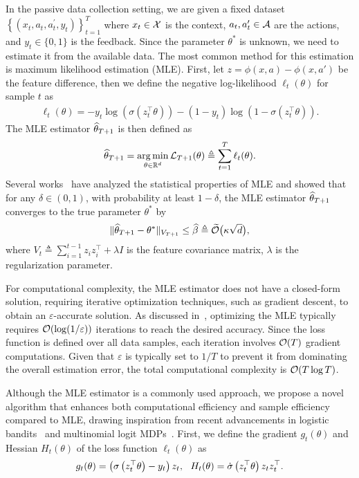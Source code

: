 In the passive data collection setting, we are given a fixed dataset $\left\{\left(x_t, a_t, a_t^{\prime}, y_t\right)\right\}_{t=1}^{T}$ where $x_t \in \mathcal{X}$ is the context, $a_t, a_t^{\prime} \in \mathcal{A}$ are the actions, and $y_t \in \{0, 1\}$ is the feedback. Since the parameter $\theta^*$ is unknown, we need to estimate it from the available data. The most common method for this estimation is maximum likelihood estimation (MLE). First, let $z = \phi(x, a) - \phi(x, a')$ be the feature difference, then we define the negative log-likelihood $\ell_t(\theta)$ for sample $t$ as
\begin{align}
  \label{eq:log-likelihood}
  \ell_t(\theta) =  - y_t \log (\sigma(z_t^{\top} \theta))- \left(1-y_t\right) \log(1-\sigma(z_t^{\top} \theta)).
\end{align}
The MLE estimator $\widehat{\theta}_{T+1}$ is then defined as
\begin{align}
  \label{eq:mle}
    \widehat{\theta}_{T+1}=\operatorname*{arg\,min}_{\theta \in \mathbb{R}^d}  \mathcal{L}_{T+1}(\theta)\triangleq \sum_{t=1}^T \ell_t(\theta).
\end{align}
Several works~\citep{ICML'23:Zhu-Principled,arXiv'24:Ji-RLHF-active} have analyzed the statistical properties of MLE and showed that for any $\delta \in (0, 1)$, with probability at least $1 - \delta$, the MLE estimator $\widehat{\theta}_{T+1}$ converges to the true parameter $\theta^*$ by
\begin{align}
  \label{eq:confidence-set-mle}
  \lVert\widehat{\theta}_{T+1}-\theta^*\rVert_{V_{T+1}} \leq \widehat{\beta} \triangleq \widetilde{\mathcal{O}}  \big(\kappa\sqrt{d}\big),
\end{align}
where $V_{t} \triangleq \sum_{i=1}^{t-1} z_i z_i^{\top} + \lambda I$ is the feature covariance matrix, $\lambda$ is the regularization parameter.

For computational complexity, the MLE estimator does not have a closed-form solution, requiring iterative optimization techniques, such as gradient descent, to obtain an $\varepsilon$-accurate solution. As discussed in~\citet{AISTATS'22:Faury-Jointly}, optimizing the MLE typically requires $\mathcal{O}(\log(1/\varepsilon))$ iterations to reach the desired accuracy. Since the loss function is defined over all data samples, each iteration involves $\mathcal{O}(T)$ gradient computations. Given that $\varepsilon$ is typically set to $1/T$ to prevent it from dominating the overall estimation error, the total computational complexity is $\mathcal{O}(T \log T)$. 

Although the MLE estimator is a commonly used approach, we propose a novel algorithm that enhances both computational efficiency and sample efficiency compared to MLE, drawing inspiration from recent advancements in logistic bandits~\citep{AISTATS'22:Faury-Jointly, NeurIPS'23:MLogB} and multinomial logit MDPs~\citep{NeurIPS'24:MNLmdp}. First, we define the gradient $g_t(\theta)$ and Hessian $H_t(\theta)$ of the loss function $\ell_t(\theta)$ as
\begin{align}
  g_t(\theta) = \left(\sigma\left(z_t^{\top} \theta\right)-y_t\right) z_t,~~ H_t(\theta) = \dot{\sigma}\left(z_t^{\top} \theta\right) z_t z_t^{\top} . \label{eq:gradient-hessian}
\end{align}



